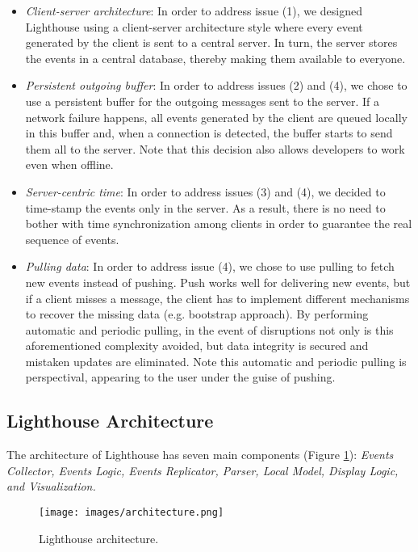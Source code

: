 \documentclass[10pt, conference, compsocconf]{IEEEtran}
\begin{document}
\begin{itemize}
 
\item \textit{Client-server architecture}: In order to address issue (1), we designed Lighthouse using a client-server architecture style where every event generated by the client is sent to a central server.  In turn, the server stores the events in a central database, thereby making them available to everyone. 

\item \textit{Persistent outgoing buffer}: In order to address issues (2) and (4), we chose to use a persistent buffer for the outgoing messages sent to the server. If a network failure happens, all events generated by the client are queued locally in this buffer and, when a connection is detected, the buffer starts to send them all to the server. Note that this decision also allows developers to work even when offline.

\item \textit{Server-centric time}: In order to address issues (3) and (4), we decided to time-stamp the events only in the server. As a result, there is no need to bother with time synchronization among clients in order to guarantee the real sequence of events.

\item \textit{Pulling data}: In order to address issue (4), we chose to use pulling to fetch new events instead of pushing. Push works well for delivering new events, but if a client misses a message, the client has to implement different mechanisms to recover the missing data (e.g. bootstrap approach).  By performing automatic and periodic pulling, in the event of disruptions not only is this aforementioned complexity avoided, but data integrity is secured and mistaken updates are eliminated.  Note this automatic and periodic pulling is perspectival, appearing to the user under the guise of pushing.
\end{itemize}

\subsection{Lighthouse Architecture}

The architecture of Lighthouse has seven main components (Figure \ref{fig:architecture}): \textit{Events Collector, Events Logic, Events Replicator, Parser, Local Model, Display Logic, and Visualization.}  

\begin{figure}[!b]
	\centering
		\texttt{[image: images/architecture.png]}
	\caption{Lighthouse architecture.}
	\label{fig:architecture}
\end{figure}
\end{document}
